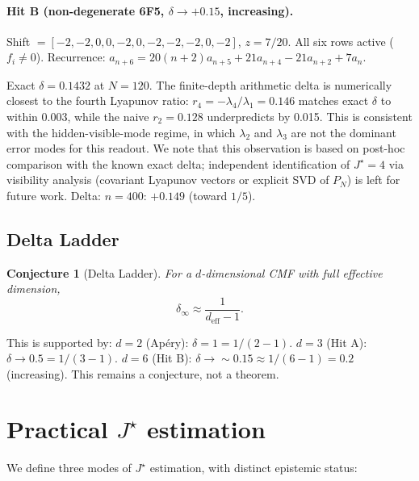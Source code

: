 \documentclass[11pt]{article}
\newtheorem{conjecture}{Conjecture}
\begin{document}
\paragraph{Hit B (non-degenerate 6F5, $\delta \to +0.15$, increasing).}
{\sloppy Shift $= [-2,-2,0,0,-2,0,-2,-2,-2,0,-2]$, $z=7/20$. All six rows active ($f_i \neq 0$). Recurrence: $a_{n+6} = 20(n{+}2)a_{n+5} + 21a_{n+4} - 21a_{n+2} + 7a_n$.\par}

Exact $\delta = 0.1432$ at $N{=}120$. The finite-depth arithmetic delta is numerically closest to the fourth Lyapunov ratio: $r_4 = -\lambda_4/\lambda_1 = 0.146$ matches exact $\delta$ to within 0.003, while the naive $r_2 = 0.128$ underpredicts by 0.015. This is consistent with the hidden-visible-mode regime, in which $\lambda_2$ and $\lambda_3$ are not the dominant error modes for this readout. We note that this observation is based on post-hoc comparison with the known exact delta; independent identification of $J^\star = 4$ via visibility analysis (covariant Lyapunov vectors or explicit SVD of $P_N$) is left for future work. Delta: $n=400$: $+0.149$ (toward $1/5$).

\subsection{Delta Ladder}

\begin{conjecture}[Delta Ladder]
For a $d$-dimensional CMF with full effective dimension,
\[
\delta_\infty \approx \frac{1}{d_{\mathrm{eff}} - 1}.
\]
\end{conjecture}

This is supported by: $d=2$ (Ap\'ery): $\delta = 1 = 1/(2-1)$. $d=3$ (Hit A): $\delta \to 0.5 = 1/(3-1)$. $d=6$ (Hit B): $\delta \to \sim 0.15 \approx 1/(6-1) = 0.2$ (increasing). This remains a conjecture, not a theorem.

\section{Practical \texorpdfstring{$J^\star$}{J*} estimation}
\label{sec:jstar}

We define three modes of $J^\star$ estimation, with distinct epistemic status:
\end{document}
